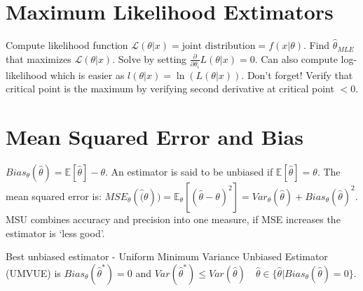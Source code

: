\documentclass[10pt]{article}
\begin{document}
\section{Maximum Likelihood Extimators}
Compute likelihood function $\mathcal{L}(\theta | x) = \text{joint distribution} = f(x | \theta)$.
Find $\hat{\theta}_{MLE}$ that maximizes $\mathcal{L}(\theta | x)$. 
Solve by setting $\frac{\partial }{ \partial \theta_i} L(\theta | x) = 0$.
Can also compute log-likelihood which is easier as $l(\theta | x) = \ln (L(\theta | x))$.
Don't forget! Verify that critical point is the maximum by verifying second derivative at critical point $< 0$.

\section{Mean Squared Error and Bias}
$Bias_\theta(\hat{\theta}) = \mathbb{E}[\hat{\theta}] - \theta$.
An estimator is said to be unbiased if $\mathbb{E}[\hat{\theta}] = \theta$.
The mean squared error is: 
$MSE_\theta(\hat(\theta)) = \mathbb{E}_\theta[(\hat{\theta} - \theta)^2] = Var_\theta(\hat{\theta}) + Bias_\theta(\hat{\theta})^2$.
MSU combines accuracy and precision into one measure, if MSE increases the estimator is `less good'.

Best unbiased estimator - Uniform Minimum Variance Unbiased Estimator (UMVUE) is $Bias_\theta (\hat{\theta}^*) = 0$ and 
$Var(\hat{\theta}^*) \leq Var(\hat{\theta}) \quad \hat{\theta} \in \{ \hat{\theta} | Bias_\theta(\hat{\theta}) = 0 \}$.
\end{document}
